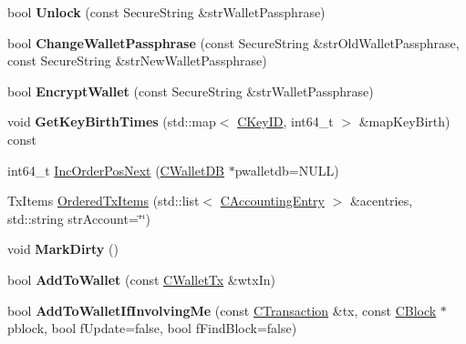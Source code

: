 \begin{DoxyCompactItemize}
\mbox{\label{class_c_wallet_a002c61a2b74f2c46063340c568e6cc1b}} 
bool {\bfseries Unlock} (const Secure\+String \&str\+Wallet\+Passphrase)
\item 
\mbox{\label{class_c_wallet_a4abcec3066e7c462f4564c159fc15031}} 
bool {\bfseries Change\+Wallet\+Passphrase} (const Secure\+String \&str\+Old\+Wallet\+Passphrase, const Secure\+String \&str\+New\+Wallet\+Passphrase)
\item 
\mbox{\label{class_c_wallet_ab34fe5bf771619dcbe22a65f013e5469}} 
bool {\bfseries Encrypt\+Wallet} (const Secure\+String \&str\+Wallet\+Passphrase)
\item 
\mbox{\label{class_c_wallet_acb2fdaf647fa2d812d58e998848e681d}} 
void {\bfseries Get\+Key\+Birth\+Times} (std\+::map$<$ \mbox{\hyperlink{class_c_key_i_d}{C\+Key\+ID}}, int64\+\_\+t $>$ \&map\+Key\+Birth) const
\item 
int64\+\_\+t \mbox{\hyperlink{class_c_wallet_a7a76d68661e6879651ac0b11f2893e58}{Inc\+Order\+Pos\+Next}} (\mbox{\hyperlink{class_c_wallet_d_b}{C\+Wallet\+DB}} $\ast$pwalletdb=N\+U\+LL)
\item 
Tx\+Items \mbox{\hyperlink{class_c_wallet_a740572131004d77fbdb4617ec1aafb4a}{Ordered\+Tx\+Items}} (std\+::list$<$ \mbox{\hyperlink{class_c_accounting_entry}{C\+Accounting\+Entry}} $>$ \&acentries, std\+::string str\+Account=\char`\"{}\char`\"{})
\item 
\mbox{\label{class_c_wallet_a26fd9a9f48230daf346500d2afb6115e}} 
void {\bfseries Mark\+Dirty} ()
\item 
\mbox{\label{class_c_wallet_ad38e26cf88434b775fa85b1f62b87ee9}} 
bool {\bfseries Add\+To\+Wallet} (const \mbox{\hyperlink{class_c_wallet_tx}{C\+Wallet\+Tx}} \&wtx\+In)
\item 
\mbox{\label{class_c_wallet_a132a6b19a6bd190ab5b15da4104513af}} 
bool {\bfseries Add\+To\+Wallet\+If\+Involving\+Me} (const \mbox{\hyperlink{class_c_transaction}{C\+Transaction}} \&tx, const \mbox{\hyperlink{class_c_block}{C\+Block}} $\ast$pblock, bool f\+Update=false, bool f\+Find\+Block=false)
\item 
\mbox{\label{class_c_wallet_adef08e0bbe4fc3ba8f0204223729289d}} 

\end{DoxyCompactItemize}

